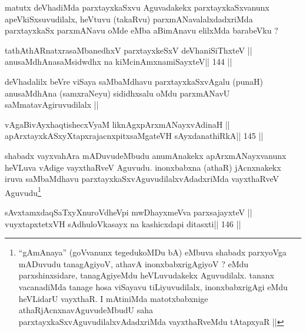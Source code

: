 \begin{artha}
matutx deVhadiMda parxtayxkaSxvu Aguvadakekx parxtayxkaSxvanunx apeVkiSxsuvudilalx, heVtuvu (takaRvu) parxmANavalalxdadxriMda parxtayxkaSx parxmANavu oMde eMba aBimAnavu elilxMda barabeVku ?
\end{artha}

\begin{shl}
\footnotemark[4]tathA\s thARnatxrasaMbanedhxV parxtayxkeSxV deVhaniSiThxteV ||
anusaMdhAnasaMsidwdhx na kiMcinAmxnamiSayxteV\hfill || 144 ||
\end{shl}

\begin{artha}
deVhadalilx beVre viSaya saMbaMdhavu parxtayxkaSxvAgalu (punaH) 
anusaMdhAna (samxraNeyu) sididhxsalu oMdu parxmANavU saMmatavAgiruvudilalx || 
\end{artha}


\begin{shl}
vAgaBivAyxhaqtishecxVyaM liknAgxpArxmANayxvAdinaH ||
apArxtayxkASxyXtapxrajacnxpitxsaMgateVH sAyxdanathiRkA\hfill || 145 ||
\end{shl}

\begin{artha}
shabadx vayxvahAra mADuvudeMbudu anumAnakekx apArxmANayxvanunx heVLuva 
vAdige vayxthaRveV Aguvudu. inonxbabxna (athaR) jAcnxnakekx iruva 
saMbaMdhavu parxtayxkaSxvAguvudilalxvAdadxriMda vayxthaRveV 
Aguvudu\footnote[5]{``gAmAnaya'' (goVvanunx tegedukoMDu bA) eMbuva 
shabadx parxyoVga mADuvudu tanagAgiyoV, athavA inonxbabxrigAgiyoV ? eMdu parxshinxsidare, tanagAgiyeMdu heVLuvudakekx Aguvudilalx. tananx vacanadiMda tanage hosa viSayavu tiLiyuvudilalx, inonxbabxrigAgi eMdu heVLidarU vayxthaR. I mAtiniMda matotxbabxnige athaRjAcnxnavAguvudeMbudU saha parxtayxkaSxvAguvudilalxvAdadxriMda vayxthaRveMdu tAtapxyaR ||}
\end{artha}

\begin{shl}
sAvxtamxdaqSaTxyXnuroVdheV\s pi mwDhayxmeVva parxsajayxteV ||
vuyxtapxtetxVH sAdhuloVkasayx na kashicxdapi ditasxti\hfill || 146 ||
\end{shl}

